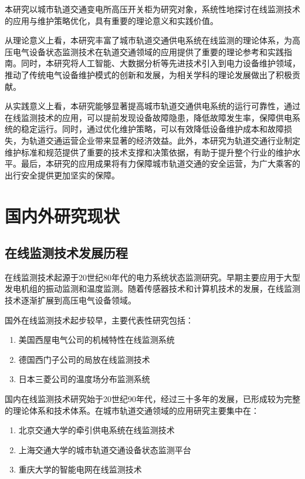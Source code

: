 本研究以城市轨道交通变电所高压开关柜为研究对象，系统性地探讨在线监测技术的应用与维护策略优化，具有重要的理论意义和实践价值。

从理论意义上看，本研究丰富了城市轨道交通供电系统在线监测的理论体系，为高压电气设备状态监测技术在轨道交通领域的应用提供了重要的理论参考和实践指南。同时，本研究将人工智能、大数据分析等先进技术引入到电力设备维护领域，推动了传统电气设备维护模式的创新和发展，为相关学科的理论发展做出了积极贡献。

从实践意义上看，本研究能够显著提高城市轨道交通供电系统的运行可靠性，通过在线监测技术的应用，可以提前发现设备故障隐患，降低故障发生率，保障供电系统的稳定运行。同时，通过优化维护策略，可以有效降低设备维护成本和故障损失，为轨道交通运营企业带来显著的经济效益。此外，本研究为轨道交通行业制定维护标准和规范提供了重要的技术支撑和决策依据，有助于提升整个行业的维护水平。最后，本研究的应用成果将有力保障城市轨道交通的安全运营，为广大乘客的出行安全提供更加坚实的保障。

\section{国内外研究现状}

\subsection{在线监测技术发展历程}

在线监测技术起源于20世纪80年代的电力系统状态监测研究。早期主要应用于大型发电机组的振动监测和温度监测。随着传感器技术和计算机技术的发展，在线监测技术逐渐扩展到高压电气设备领域。

国外在线监测技术起步较早，主要代表性研究包括：
\begin{enumerate}
    \item 美国西屋电气公司的机械特性在线监测系统
    \item 德国西门子公司的局放在线监测技术
    \item 日本三菱公司的温度场分布监测系统
\end{enumerate}

国内在线监测技术研究始于20世纪90年代，经过三十多年的发展，已形成较为完整的理论体系和技术体系。在城市轨道交通领域的应用研究主要集中在：
\begin{enumerate}
    \item 北京交通大学的牵引供电系统在线监测技术
    \item 上海交通大学的城市轨道交通设备状态监测平台
    \item 重庆大学的智能电网在线监测技术
\end{enumerate}

